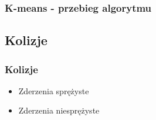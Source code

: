 \documentclass{beamer}
\begin{document}
\frame
{
	\frametitle{K-means - przebieg algorytmu}
	\begin{figure}
		\centering
	   	 \hspace{0cm}
	   	 \hspace{0cm}
		\pause
	   	 \hspace{0cm}
	   	 \hspace{0cm}
	\end{figure}
}

\subsection{Kolizje}
\frame
{
	\frametitle{Kolizje}
	\begin{itemize}
		\item{Zderzenia sprężyste}
		\item{Zderzenia niesprężyste}
	\end{itemize}
}
\end{document}
